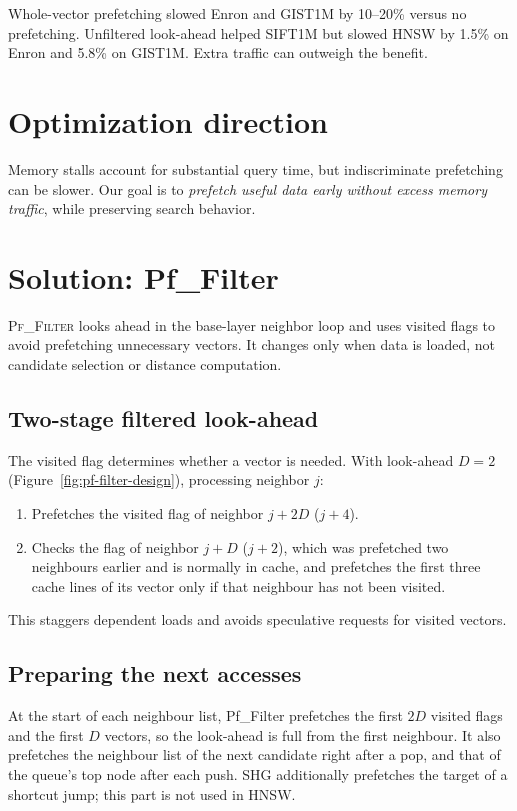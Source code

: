 \documentclass[11pt]{article}
\begin{document}
Whole-vector prefetching slowed Enron and GIST1M by 10--20\% versus
no prefetching. Unfiltered look-ahead helped SIFT1M but slowed HNSW by
1.5\% on Enron and 5.8\% on GIST1M. Extra traffic can outweigh the benefit.

\section{Optimization direction}

Memory stalls account for substantial query time, but indiscriminate
prefetching can be slower. Our goal is to \emph{prefetch useful data early
without excess memory traffic}, while preserving search behavior.

\section{Solution: Pf\_Filter}
\label{sec:pf-filter}

\textsc{Pf\_Filter} looks ahead in the base-layer neighbor loop and
uses visited flags to avoid prefetching unnecessary vectors. It changes only when data is loaded, not candidate selection or distance computation.

\subsection{Two-stage filtered look-ahead}

The visited flag determines whether a vector is needed. With look-ahead
$D=2$ (Figure~\ref{fig:pf-filter-design}), processing neighbor $j$:
\begin{enumerate}
  \item Prefetches the visited flag of neighbor $j+2D$ ($j+4$).
  \item Checks the flag of neighbor $j+D$ ($j+2$), which was prefetched two neighbours earlier and is normally in cache, and prefetches the first three cache lines of its vector only if that neighbour has not been visited.
\end{enumerate}

This staggers dependent loads and avoids speculative requests for visited
vectors.

\subsection{Preparing the next accesses}

At the start of each neighbour list, Pf\_Filter prefetches the first $2D$ visited flags and the first $D$ vectors, so the look-ahead is full from the first neighbour. It also prefetches the neighbour list of the next candidate right after a pop, and that of the queue's top node after each push. SHG additionally prefetches the target of a shortcut jump; this part is not used in HNSW.
\end{document}
